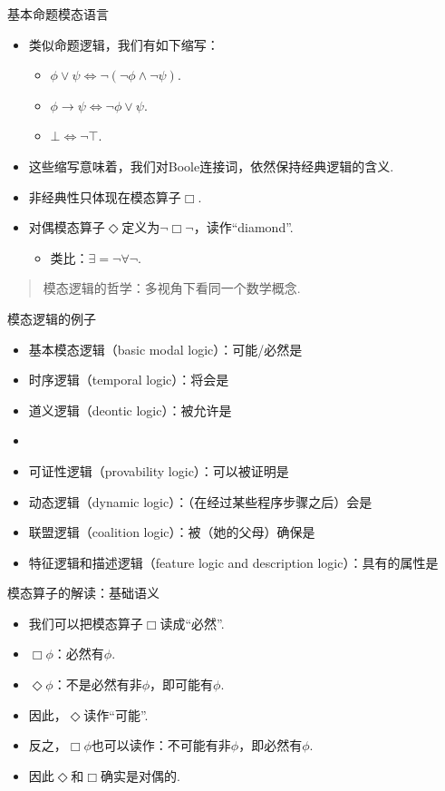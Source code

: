     {基本命题模态语言}
    \begin{itemize}
        \item 类似命题逻辑，我们有如下缩写：
        \begin{itemize}
            \item $\phi\vee\psi\iff\neg(\neg \phi\wedge\neg\psi)$.
            \item $\phi\to\psi\iff\neg\phi\vee\psi$.
            \item $\bot\iff\neg\top$.
        \end{itemize}
        \item 这些缩写意味着，我们对Boole连接词，依然保持经典逻辑的含义.
        \item 非经典性只体现在模态算子$\Box$.
        \item 对偶模态算子$\Diamond$定义为$\neg\Box\neg$，读作“diamond”.
        \begin{itemize}
            \item 类比：$\exists=\neg\forall\neg$.
        \end{itemize}
    \end{itemize}
    
    {}
        \begin{quotation}
        模态逻辑的哲学：多视角下看同一个数学概念.
        \end{quotation}
    
    
    {模态逻辑的例子}
    \begin{itemize}
        \item 基本模态逻辑（basic modal logic）：可能/必然是
        \item 时序逻辑（temporal logic）：将会是
        \item 道义逻辑（deontic logic）：被允许是
        \item {}
        \item 可证性逻辑（provability logic）：可以被证明是
        \item 动态逻辑（dynamic logic）：（在经过某些程序步骤之后）会是
        \item 联盟逻辑（coalition logic）：被（她的父母）确保是
        \item 特征逻辑和描述逻辑（feature logic and description logic）：具有的属性是
    \end{itemize}
    
    
    {模态算子的解读：基础语义}
    \begin{itemize}
        \item 我们可以把模态算子$\Box$读成“必然”.
        \item $\Box\phi$：必然有$\phi$.
        \item $\Diamond\phi$：不是必然有非$\phi$，即可能有$\phi$.
        \item 因此，$\Diamond$读作“可能”.
        \item 反之，$\Box\phi$也可以读作：不可能有非$\phi$，即必然有$\phi$.
        \item 因此$\Diamond$和$\Box$确实是对偶的.
    \end{itemize}
    
